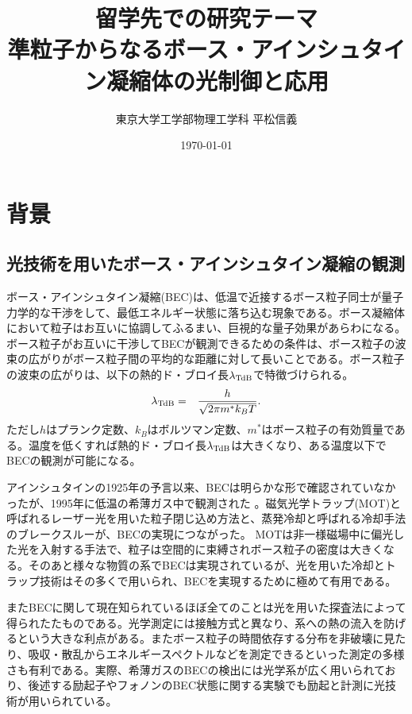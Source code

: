 \documentclass[11pt,a4paper]{jsarticle}
\title{留学先での研究テーマ\\準粒子からなるボース・アインシュタイン凝縮体の光制御と応用}
\author{東京大学工学部物理工学科 平松信義}
\date{\today}
\begin{document}
\maketitle
\thispagestyle{mypagestyle}

\section{背景}
\subsection{光技術を用いたボース・アインシュタイン凝縮の観測}
ボース・アインシュタイン凝縮(BEC)は、低温で近接するボース粒子同士が量子力学的な干渉をして、最低エネルギー状態に落ち込む現象である。ボース凝縮体において粒子はお互いに協調してふるまい、巨視的な量子効果があらわになる。
ボース粒子がお互いに干渉してBECが観測できるための条件は、ボース粒子の波束の広がりがボース粒子間の平均的な距離に対して長いことである。ボース粒子の波束の広がりは、以下の熱的ド・ブロイ長$\lambda_{\rm TdB}$で特徴づけられる。
\begin{eqnarray}
\lambda_{\rm TdB} &=& \frac{h}{\sqrt{2\pi m^* k_B T}}.
\label{eq:lambda}
\end{eqnarray}
ただし$h$はプランク定数、$k_B$はボルツマン定数、$m^*$はボース粒子の有効質量である。温度を低くすれば熱的ド・ブロイ長$\lambda_{\rm TdB}$は大きくなり、ある温度以下でBECの観測が可能になる。%

アインシュタインの1925年の予言以来、BECは明らかな形で確認されていなかったが、1995年に低温の希薄ガス中で観測された
\cite{Davis,Anderson}。磁気光学トラップ(MOT)と呼ばれるレーザー光を用いた粒子閉じ込め方法と、蒸発冷却と呼ばれる冷却手法のブレークスルーが、BECの実現につながった。%
MOTは非一様磁場中に偏光した光を入射する手法で、粒子は空間的に束縛されボース粒子の密度は大きくなる。そのあと様々な物質の系でBECは実現されているが、光を用いた冷却とトラップ技術はその多くで用いられ\cite{ketterle}、BECを実現するために極めて有用である。

またBECに関して現在知られているほぼ全てのことは光を用いた探査法によって得られたたものである\cite{ketterle}。光学測定には接触方式と異なり、系への熱の流入を防げるという大きな利点がある。またボース粒子の時間依存する分布を非破壊に見たり、吸収・散乱からエネルギースペクトルなどを測定できるといった測定の多様さも有利である。実際、希薄ガスのBECの検出には光学系が広く用いられており、後述する励起子\cite{Lin,Yoshioka}やフォノン\cite{Misochko}のBEC状態に関する実験でも励起と計測に光技術が用いられている。
\end{document}
